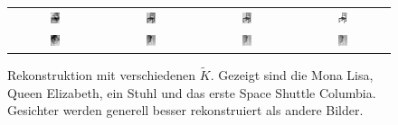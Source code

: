 \begin{figure}[ht]
\begin{tabular}{cccc}
		\includegraphics[width=0.1\textwidth]{images/compression/chair_20} &
		\includegraphics[width=0.1\textwidth]{images/compression/chair_200} &
		\includegraphics[width=0.1\textwidth]{images/compression/chair_2000} & \includegraphics[width=0.1\textwidth]{images/compression/chair} \\
		\includegraphics[width=0.1\textwidth]{images/compression/columbia_20} &
		\includegraphics[width=0.1\textwidth]{images/compression/columbia_200} &
		\includegraphics[width=0.1\textwidth]{images/compression/columbia_2000} & \includegraphics[width=0.1\textwidth]{images/compression/columbia}
	\end{tabular}
	\caption{Rekonstruktion mit verschiedenen $\tilde K$. Gezeigt sind die Mona Lisa, Queen Elizabeth, ein Stuhl und das erste Space Shuttle \glqq{}Columbia\grqq{}. Gesichter werden generell besser rekonstruiert als andere Bilder.}
	\label{fig:compression}
\end{figure}
